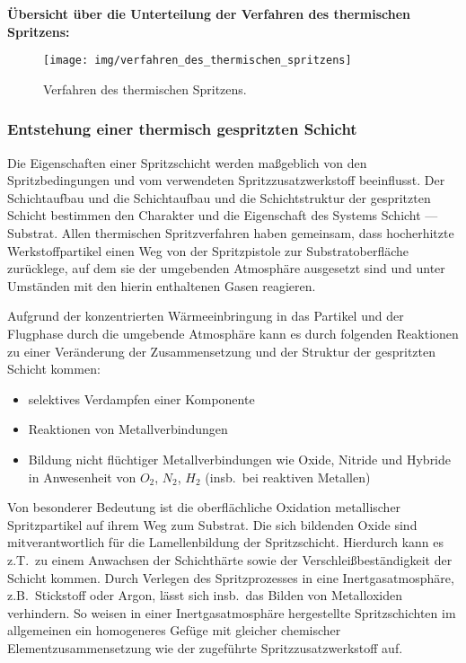 \documentclass[12pt,a4paper,bibliography=totocnumbered,listof=totocnumbered,fleqn]{scrartcl}
\begin{document}
\textbf{Übersicht über die Unterteilung der Verfahren des thermischen Spritzens:}\\

\begin{figure}[h]
\centering
\texttt{[image: img/verfahren\_des\_thermischen\_spritzens]}
\caption{Verfahren des thermischen Spritzens.}
\label{fig:thermischspritzenverfahren}
\end{figure}

\subsubsection{Entstehung einer thermisch gespritzten Schicht}

Die Eigenschaften einer Spritzschicht werden maßgeblich von den Spritzbedingungen und vom verwendeten Spritzzusatzwerkstoff beeinflusst.
Der Schichtaufbau und die Schichtaufbau und die Schichtstruktur der gespritzten Schicht bestimmen den Charakter und die Eigenschaft des Systems Schicht --- Substrat.
Allen thermischen Spritzverfahren haben gemeinsam, dass hocherhitzte Werkstoffpartikel einen Weg von der Spritzpistole zur Substratoberfläche zurücklege, auf dem sie der umgebenden Atmosphäre ausgesetzt sind und unter Umständen mit den hierin enthaltenen Gasen reagieren.

Aufgrund der konzentrierten Wärmeeinbringung in das Partikel und der Flugphase durch die umgebende Atmosphäre kann es durch folgenden Reaktionen zu einer Veränderung der Zusammensetzung und der Struktur der gespritzten Schicht kommen:\\

\begin{itemize}
	\item selektives Verdampfen einer Komponente
	\item Reaktionen von Metallverbindungen
	\item Bildung nicht flüchtiger Metallverbindungen wie Oxide, Nitride und Hybride in Anwesenheit von $O_{2}$, $N_{2}$, $H_{2}$ (insb.\ bei reaktiven Metallen)
\end{itemize}

Von besonderer Bedeutung ist die oberflächliche Oxidation metallischer Spritzpartikel auf ihrem Weg zum Substrat.
Die sich bildenden Oxide sind mitverantwortlich für die Lamellenbildung der Spritzschicht.
Hierdurch kann es z.T.\ zu einem Anwachsen der Schichthärte sowie der Verschleißbeständigkeit der Schicht kommen.
Durch Verlegen des Spritzprozesses in eine Inertgasatmosphäre, z.B.\ Stickstoff oder Argon, lässt sich insb.\ das Bilden von Metalloxiden verhindern.
So weisen in einer Inertgasatmosphäre hergestellte Spritzschichten im allgemeinen ein homogeneres Gefüge mit gleicher chemischer Elementzusammensetzung wie der zugeführte Spritzzusatzwerkstoff auf.
\end{document}
